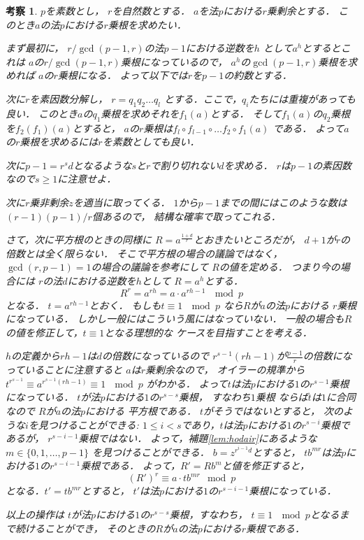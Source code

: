 \documentclass[leqno]{jsarticle}
\newtheorem{kou}[thm]{考察}
\begin{document}
\begin{kou}
$p$を素数とし，
$r$を自然数とする．
$a$を法$p$における$r$乗剰余とする．
このとき$a$の法$p$における$r$乗根を求めたい．

まず最初に，
$r/\gcd(p-1, r)$の法$p-1$における逆数を$h$
として$a^h$とするとこれは
$a$の$r/\gcd(p-1, r)$乗根になっているので，
$a^h$の$\gcd(p-1, r)$乗根を求めれば
$a$の$r$乗根になる．
よって以下では$r$を$p-1$の約数とする．


次に$r$を素因数分解し，
$r=q_1q_2\dots q_l$
とする．ここで，$q_i$たちには重複があっても良い．
このとき$a$の$q_1$乗根を求めそれを$f_1(a)$とする．
そして$f_1(a)$の$q_2$乗根を$f_2(f_1)(a)$とすると，
$a$の$r$乗根は$f_l\circ f_{l-1}\circ\dots f_2\circ f_1(a)$
である．
よって$a$の$r$乗根を求めるには$r$を素数としても良い．


次に$p-1=r^{s}d$となるような$s$と$r$で割り切れない$d$を求める．
$r$は$p-1$の素因数なので$s\ge 1$に注意せよ．

次に$r$乗非剰余$z$を適当に取ってくる．
$1$から$p-1$までの間にはこのような数は$(r-1)(p-1)/r$個あるので，
結構な確率で取ってこれる．


さて，次に平方根のときの同様に
$R=a^{\frac{1+d}{r}}$とおきたいところだが，
$d+1$が$r$の倍数とは全く限らない．
そこで平方根の場合の議論ではなく，
$\gcd(r, p-1)=1$の場合の議論を参考にして
$R$の値を定める．
つまり今の場合には
$r$の法$d$における逆数を$h$として
$R=a^h$とする．
\[
R^r=a^{rh}=a\cdot a^{rh-1}\ \mod p
\]
となる．
$t=a^{rh-1}$とおく．
もしも$t\equiv 1\  \mod p$
なら$R$が$a$の法$p$における
$r$乗根
になっている．
しかし一般にはこういう風にはなっていない．
一般の場合も$R$の値を修正して，$t\equiv 1$となる理想的な
ケースを目指すことを考える．

$h$の定義から$rh-1$は$d$の倍数になっているので
$r^{s-1}(rh-1)$が$\frac{p-1}{r}$の倍数になっていることに注意すると
$a$は$r$乗剰余なので，
オイラーの規準から
$t^{r^{s-1}}\equiv a^{r^{s-1}(rh-1)}\equiv 1\ \mod p$
がわかる．
よって$t$は法$p$における$1$の$r^{s-1}$乗根になっている．
$t$が法$p$における$1$の$r^{s-s}$乗根，
すなわち$1$乗根
ならば$t$は$1$に合同なので
$R$が$a$の法$p$における
平方根である．
$t$がそうではないとすると，
次のような$i$を見つけることができる:
$1\le i<s$であり，$t$は法$p$における$1$の$r^{s-i}$乗根であるが，
$r^{s-i-1}$乗根ではない．
よって，補題\ref{lem:hodair}にあるような$m\in\{0, 1, \dots, p-1\}$
を見つけることができる．
$b=z^{r^{i-1}d}$とすると，
$tb^{mr}$は法$p$における$1$の$r^{s-i-1}$乗根である．
よって，$R'=Rb^m$と値を修正すると，
\[
(R')^r\equiv a\cdot tb^{mr} \mod p
\]
となる．$t'=tb^{mr}$とすると，
$t'$は法$p$における$1$の$r^{s-i-1}$乗根になっている．


以上の操作は
$t$が法$p$における$1$の$r^{s-s}$乗根，すなわち，
$t\equiv 1\ \mod p$となるまで続けることができ，
そのときの$R$が$a$の法$p$における$r$乗根である．

\end{kou}
\end{document}
